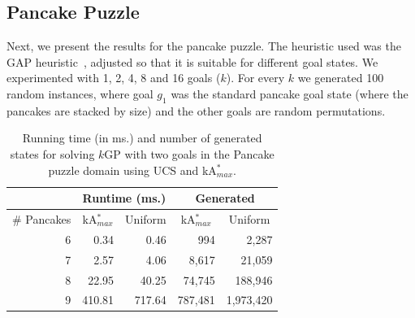 \documentclass{aicom2e}
\newcommand{\kgs}{$k$GP}
\newcommand{\kastar}{kA$^*$}
\newcommand{\kastarmax}{kA$^*_{max}$}
\newcommand{\kxastar}{k$\times$A$^*$}
\newcommand{\roni}[1]{\textbf{[RS:#1]}}
\begin{document}


\subsection{Pancake Puzzle}



Next, we present the results for the pancake puzzle. The heuristic used was the GAP heuristic~\cite{helmert2010landmark}, adjusted so that it is suitable for different goal states.
We experimented with 1, 2, 4, 8 and 16 goals ($k$). For every $k$ we generated 100 random instances, where goal $g_1$ was the standard pancake goal state (where the pancakes are stacked by size) and the other goals are random permutations.


\begin{table}[]
	\centering
	\begin{tabular}{|r|r|r|r|r|}
		\hline
		\multicolumn{1}{|l|}{}            & \multicolumn{2}{c|}{Runtime (ms.)}                                       & \multicolumn{2}{c|}{Generated} \\ \hline
		\multicolumn{1}{|c|}{\# Pancakes} & \multicolumn{1}{c}{\kastarmax{}} & \multicolumn{1}{c|}{Uniform} & \multicolumn{1}{c}{\kastarmax{}} & \multicolumn{1}{c|}{Uniform} \\ \hline
		6                               & 0.34                                      & 0.46                        & 994                                       & 2,287                       \\
		7                               & 2.57                                      & 4.06                        & 8,617                                     & 21,059                      \\
		8                               & 22.95                                     & 40.25                       & 74,745                                    & 188,946                     \\
		9                               & 410.81                                    & 717.64                      & 787,481                                   &
		1,973,420\\
		\hline
	\end{tabular}
	\caption{Running time (in ms.) and number of generated states for solving \kgs{} with two goals
		in the Pancake puzzle domain using UCS and \kastarmax{}.}
	\label{tab:pancake-max-uniform}
\end{table}
\end{document}
